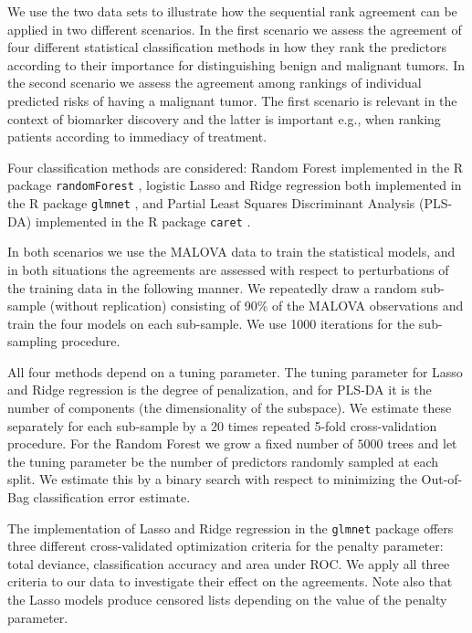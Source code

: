 \documentclass[12pt,a4paper]{article}
\theoremstyle{plain}
\begin{document}
We use the two data sets to illustrate how the sequential rank
agreement can be applied in two different scenarios. In the first
scenario we assess the agreement of four different statistical
classification methods in how they rank the predictors according to
their importance for distinguishing benign and malignant tumors. In
the second scenario we assess the agreement among rankings of
individual predicted risks of having a malignant tumor. The first
scenario is relevant in the context of biomarker discovery and the
latter is important e.g., when ranking patients according to immediacy of
treatment.

Four classification methods are considered: Random Forest
\citep{breiman2001random} implemented in the R package
\texttt{randomForest} \citep{liaw2002classification}, logistic Lasso
\citep{tibshirani1996regression} and Ridge regression
\citep{segerstedt1992ordinary} both implemented in the R package
\texttt{glmnet} \citep{friedman2010regularization}, and Partial Least
Squares Discriminant Analysis (PLS-DA) \citep{boulesteix2004pls}
implemented in the R package \texttt{caret} \citep{Jed-Wing:2014aa}.

In both scenarios we use the MALOVA data to train the statistical
models, and in both situations the agreements are assessed with
respect to perturbations of the training data in the following
manner. We repeatedly draw a random sub-sample (without replication)
consisting of 90\% of the MALOVA observations and train the four
models on each sub-sample. We use 1000 iterations for the sub-sampling
procedure.

All four methods depend on a tuning parameter. The tuning parameter for
Lasso and Ridge regression is the degree of penalization, and for PLS-DA
it is the number of components (the dimensionality of the subspace).
We estimate these separately for each sub-sample by a 20 times repeated
5-fold cross-validation procedure. For the Random Forest we grow a fixed
number of $5000$ trees and let the tuning parameter be the number of
predictors randomly sampled at each split. We estimate this by a binary
search with respect to minimizing the Out-of-Bag classification error estimate.

The implementation of Lasso and Ridge regression in the
\texttt{glmnet} package offers three different cross-validated
optimization criteria for the penalty parameter: total deviance,
classification accuracy and area under ROC. We apply all three
criteria to our data to investigate their effect on the agreements.
Note also that the Lasso models produce censored lists depending on
the value of the penalty parameter.
\end{document}
